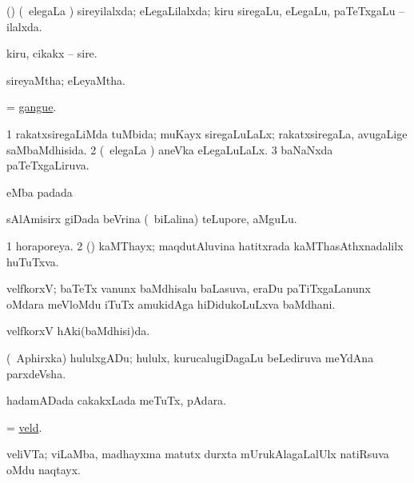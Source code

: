 \bentry
{} 
\gl{\gu}
\expl{}
\bmng
 (\savi) (\kanmu\ elegaLa \vi) sireyilalxda; eLegaLilalxda; kiru siregaLu, eLegaLu, paTeTxgaLu -- ilalxda. 
\emng
\eentry

\bentry
{} 
\gl{\nA}
\expl{}
\bmng
 kiru, cikakx -- sire. 
\emng
\eentry

\bentry
{} 
\gl{\gu}
\expl{}
\bmng
 sireyaMtha; eLeyaMtha. 
\emng
\eentry

\bentry
{} 
\gl{\nA}
\expl{}
\bmng
 = \hyperref{kandict_g.pdf}{G}{gangue}{gangue}. 
\emng
\eentry

\bentry
{} 
\gl{\gu}
\bmng
\bnum
\num{1} rakatxsiregaLiMda tuMbida; muKayx siregaLuLaLx; rakatxsiregaLa, avugaLige saMbaMdhisida. 
\num{2} (\kanmu\ elegaLa \vi) aneVka eLegaLuLaLx. 
\num{3} baNaNxda paTeTxgaLiruva. 
\enum
\emng
\eentry

\bentry
{} 
\gl{\nA}
\expl{}
\bmng
  eMba padada \bava 
\emng
\eentry

\bentry
{} 
\gl{\nA}
\bmng
 sAlAmisirx giDada beVrina (\kanmu\ biLalina) teLupore, aMguLu. 
\emng
\eentry

\bentry
{} 
\gl{\gu}
\expl{}
\bmng
\bnum
\num{1} horaporeya. 
\num{2} (\dhavxni) kaMThayx; maqdutAluvina hatitxrada kaMThasAthxnadalilx huTuTxva. 
\enum
\emng
\eentry

\bentry
{} 
\gl{\nA}
\expl{(\P)}
\bmng
 velfkorxV; baTeTx \mo vanunx baMdhisalu baLasuva, eraDu paTiTxgaLanunx oMdara meVloMdu iTuTx amukidAga hiDidukoLuLxva baMdhani. 
\emng
\eentry

\bentry
{} 
\gl{\gu}
\expl{}
\bmng
 velfkorxV hAki(baMdhisi)da. 
\emng
\eentry

\bentry
{} 
\gl{\nA}
\expl{}
\bmng
 (\da\ Aphirxka) hululxgADu; hululx, kurucalugiDagaLu beLediruva meYdAna parxdeVsha. 
\emng
\eentry

\bentry
{} 
\gl{\nA}
\expl{}
\bmng
hadamADada cakakxLada meTuTx, pAdara. 
\emng
\eentry

\bentry
{} 
\gl{\nA}
\expl{}
\bmng
 = \hyperlink{veld}{veld}. 
\emng
\eentry

\bentry
{} 
\gl{\nA}
\expl{}
\bmng
 veliVTa; viLaMba, madhayxma matutx durxta mUrukAlagaLalUlx natiRsuva oMdu naqtayx. 
\emng
\eentry

